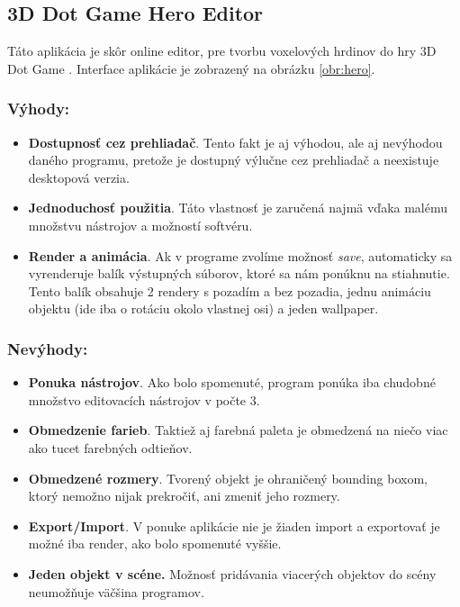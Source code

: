 \subsection{3D Dot Game Hero Editor}
Táto aplikácia je skôr online editor, pre tvorbu voxelových hrdinov do hry 3D Dot Game \cite{dotGame}. Interface aplikácie je zobrazený na obrázku \ref{obr:hero}.
\subsubsection{Výhody:}
\begin{itemize}
	\item \textbf{Dostupnosť cez prehliadač}. Tento fakt je aj výhodou, ale aj nevýhodou daného programu, pretože je dostupný výlučne cez prehliadač a neexistuje desktopová verzia.
	\item \textbf{Jednoduchosť použitia}. Táto vlastnosť je zaručená najmä vďaka malému množstvu nástrojov a možností softvéru.
	\item \textbf{Render a animácia}. Ak v programe zvolíme možnosť \textit{save}, automaticky sa vyrenderuje balík výstupných súborov, ktoré sa nám ponúknu na stiahnutie. Tento balík obsahuje 2 rendery s pozadím a bez pozadia, jednu animáciu objektu (ide iba o rotáciu okolo vlastnej osi) a jeden wallpaper. 
\end{itemize}

\subsubsection{Nevýhody:}
\begin{itemize}
	\item \textbf{Ponuka nástrojov}. Ako bolo spomenuté, program ponúka iba chudobné množstvo editovacích nástrojov v počte 3.
	\item \textbf{Obmedzenie farieb}. Taktiež aj farebná paleta je obmedzená na niečo viac ako tucet farebných odtieňov.
	\item \textbf{Obmedzené rozmery}. Tvorený objekt je ohraničený bounding boxom, ktorý nemožno nijak prekročiť, ani zmeniť jeho rozmery.
	\item \textbf{Export/Import}. V ponuke aplikácie nie je žiaden import a exportovať je možné iba render, ako bolo spomenuté vyššie.
	\item \textbf{Jeden objekt v scéne.} Možnosť pridávania viacerých objektov do scény neumožňuje väčšina programov.
\end{itemize}

